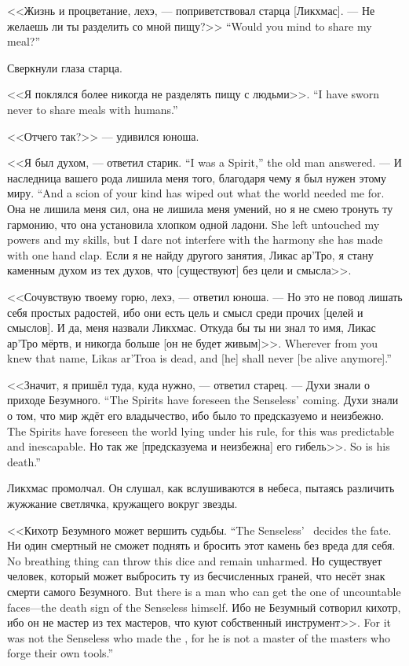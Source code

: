<<Жизнь и процветание, лехэ, --- поприветствовал старца [Ликхмас].
{--- Не желаешь ли ты разделить со мной пищу?>>}
{``Would you mind to share my meal?''}

Сверкнули глаза старца.

{<<Я поклялся более никогда не разделять пищу с людьми>>.}
{``I have sworn never to share meals with humans.''}

<<Отчего так?>> --- удивился юноша.

{<<Я был духом, --- ответил старик.}
{``I was a Spirit,'' the old man answered.}
{--- И наследница вашего рода лишила меня того, благодаря чему я был нужен этому миру.}
{``And a scion of your kind has wiped out what the world needed me for.}
{Она не лишила меня сил, она не лишила меня умений, но я не смею тронуть ту гармонию, что она установила хлопком одной ладони.}
{She left untouched my powers and my skills, but I dare not interfere with the harmony she has made with one hand clap.}
Если я не найду другого занятия, Ликас ар'Тро, я стану каменным духом из тех духов, что [существуют] без цели и смысла>>.

<<Сочувствую твоему горю, лехэ, --- ответил юноша.
--- Но это не повод лишать себя простых радостей, ибо они есть цель и смысл среди прочих [целей и смыслов].
И да, меня назвали Ликхмас.
{Откуда бы ты ни знал то имя, Ликас ар'Тро мёртв, и никогда больше [он не будет живым]>>.}
{Wherever from you knew that name, Likas ar'Troa is dead, and [he] shall never [be alive anymore].''}

<<Значит, я пришёл туда, куда нужно, --- ответил старец.
{--- Духи знали о приходе Безумного.}
{``The Spirits have foreseen the Senseless' coming.}
{Духи знали о том, что мир ждёт его владычество, ибо было то предсказуемо и неизбежно.}
{The Spirits have foreseen the world lying under his rule, for this was predictable and inescapable.}
{Но так же [предсказуема и неизбежна] его гибель>>.}
{So is his death.''}

Ликхмас промолчал.
Он слушал, как вслушиваются в небеса, пытаясь различить жужжание светлячка, кружащего вокруг звезды.

{<<Кихотр Безумного может вершить судьбы.}
{``The Senseless' \Kihotr\ decides the fate.}
{Ни один смертный не сможет поднять и бросить этот камень без вреда для себя.}
{No breathing thing can throw this dice and remain unharmed.}
{Но существует человек, который может выбросить ту из бесчисленных граней, что несёт знак смерти самого Безумного.}
{But there is a man who can get the one of uncountable faces---the death sign of the Senseless himself.}
{Ибо не Безумный сотворил кихотр, ибо он не мастер из тех мастеров, что куют собственный инструмент>>.}
{For it was not the Senseless who made the \Kihotr, for he is not a master of the masters who forge their own tools.''}

